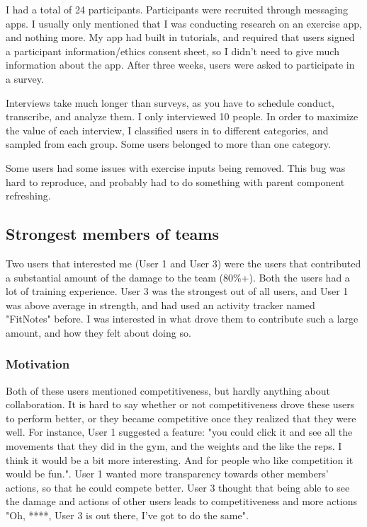 \documentclass{l4proj}
\begin{document}
I had a total of 24 participants. Participants were recruited through messaging apps. I usually only mentioned that I was conducting research on an exercise app, and nothing more. My app had built in tutorials, and required that users signed a participant information/ethics consent sheet, so I didn't need to give much information about the app. After three weeks, users were asked to participate in a survey.


Interviews take much longer than surveys, as you have to schedule conduct, transcribe, and analyze them. I only interviewed 10 people. In order to maximize the value of each interview, I classified users in to different categories, and sampled from each group. Some users belonged to more than one category. 

Some users had some issues with exercise inputs being removed. This bug was hard to reproduce, and probably had to do something with parent component refreshing. 

\subsection{Strongest members of teams}
Two users that interested me (User 1 and User 3) were the users that contributed a substantial amount of the damage to the team (80\%+). Both the users had a lot of training experience. User 3 was the strongest out of all users, and User 1 was above average in strength, and had used an activity tracker named "FitNotes" before. I was interested in what drove them to contribute such a large amount, and how they felt about doing so. 

\subsubsection{Motivation}
Both of these users mentioned competitiveness, but hardly anything about collaboration. It is hard to say whether or not competitiveness drove these users to perform better, or they became competitive once they realized that they were well. For instance, User 1 suggested a feature: "you could click it and see all the movements that they did in the gym, and the weights and the like the reps. I think it would be a bit more interesting. And for people who like competition it would be fun.". User 1 wanted more transparency towards other members' actions, so that he could compete better. User 3 thought that being able to see the damage and actions of other users leads to competitiveness and more actions "Oh, ****, User 3 is out there, I've got to do the same". 
\end{document}
